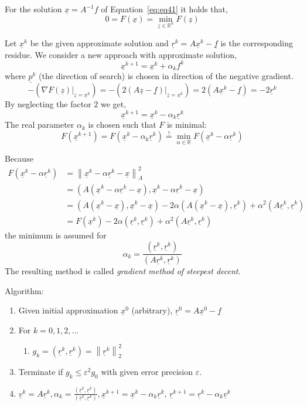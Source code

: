 \documentclass{article}
\newcommand{\norm}[1]{\left\|#1\right\|}
\begin{document}
For the solution $\underline{x} = A^{-1} f$ of Equation~\ref{eq:eq41} it holds that,
\[ 0 = F(\underline{x}) = \min_{\underline{z} \in \mathbb R^n} F(\underline{z}) \]

Let $\underline{x}^k$ be the given approximate solution and $\underline{r}^k = A \underline{x}^k - \underline{f}$ is the corresponding residue.
We consider a new approach with approximate solution,
\[ \underline{x}^{k+1} = \underline{x}^k + \alpha_k f^k \]
where $\underline{p}^k$ (the direction of search) is chosen in direction of the negative gradient.
\[ -\left(\left.\nabla F(\underline{z})\right|_{\underline{z} = \underline{x}^k}\right) = -\left(\left.2 (A\underline{z} - \underline{f})\right|_{\underline{z} = \underline{x}^k}\right) = 2(A \underline{x}^k - \underline{f}) = -2\underline{r}^k \]
By neglecting the factor $2$ we get,
\[ \underline{x}^{k+1} = \underline{x}^k - \alpha_k \underline{r}^k \]
The real parameter $\alpha_k$ is chosen such that $F$ is minimal:
\[ F(\underline{x}^{k+1}) = F\left(\underline{x}^k - \alpha_k \underline{r}^k\right) \stackrel!= \min_{\alpha \in \mathbb R} F\left(\underline{x}^k - \alpha \underline{r}^k\right) \]

Because
\begin{align*}
  F(\underline{x}^k - \alpha \underline{r}^k)
    &= \norm{\underline{x}^k - \alpha \underline{r}^k - \underline{x}}_A^2 \\
    &= (A(\underline{x}^k - \alpha \underline{r}^k - \underline{x}), \underline{x}^k - \alpha \underline{r}^k - \underline{x}) \\
    &= (A(\underline{x}^k - \underline{x}), \underline{x}^k - \underline{x}) - 2 \alpha (A(\underline{x}^k - \underline{x}), \underline{r}^k) + \alpha^2 (A \underline{r}^k, \underline{r}^k) \\
    &= F(\underline{x}^k) - 2\alpha (\underline{r}^k, \underline{r}^k) + \alpha^2 (A \underline{r}^k, \underline{r}^k)
\end{align*}
the minimum is assumed for
\[ \alpha_k = \frac{(\underline{r}^k, \underline{r}^k)}{(A\underline{r}^k, \underline{r}^k)} \]
The resulting method is called \emph{gradient method of steepest decent}.

Algorithm:
\begin{enumerate}
  \item Given initial approximation $\underline{x}^0$ (arbitrary), $\underline{r}^0 = A \underline{x}^0 - \underline{f}$
  \item For $k=0,1,2,\ldots$
    \begin{enumerate}
      \item $g_k = (\underline r^k, \underline r^k) = \norm{\underline r^k}_2^2$
    \end{enumerate}
  \item Terminate if $g_k \leq \varepsilon^2 g_0$ with given error precision $\varepsilon$.
  \item $\underline v^k = A \underline r^k, \alpha_k = \frac{(\underline r^k, \underline r^k)}{(\underline v^k, \underline r^k)}, \underline x^{k+1} = \underline x^k - \alpha_k \underline r^k$, $\underline r^{k+1} = \underline r^k - \alpha_k \underline v^k$
\end{enumerate}
\end{document}
